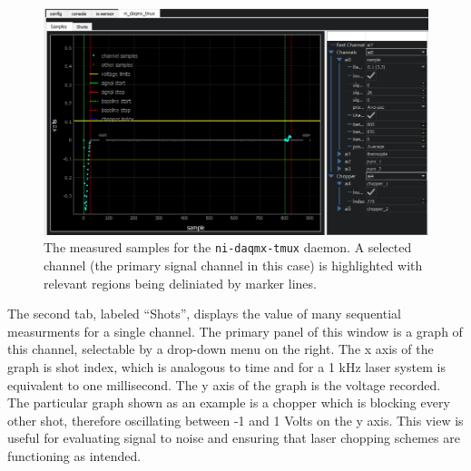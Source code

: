 \begin{landscape}
\begin{figure}
\includegraphics[width=8in]{"yaq/images/ni_daq_samples"}
\caption[\yaqcqtpy{} NI DAQmx Tmux Plugin (samples)]{
	The measured samples for the \texttt{ni-daqmx-tmux} daemon.
	A selected channel (the primary signal channel in this case) is highlighted with relevant regions being deliniated by marker lines.
}
\label{yaq:fig:ni_daq_samples}
\end{figure}
\end{landscape}

The second tab, labeled ``Shots'', displays the value of many sequential measurments for a single channel.
The primary panel of this window is a graph of this channel, selectable by a drop-down menu on the right.
The x axis of the graph is shot index, which is analogous to time and for a 1 kHz laser system is equivalent to one millisecond.
The y axis of the graph is the voltage recorded.
The particular graph shown as an example is a chopper which is blocking every other shot, therefore oscillating between -1 and 1 Volts on the y axis.
This view is useful for evaluating signal to noise and ensuring that laser chopping schemes are functioning as intended.


